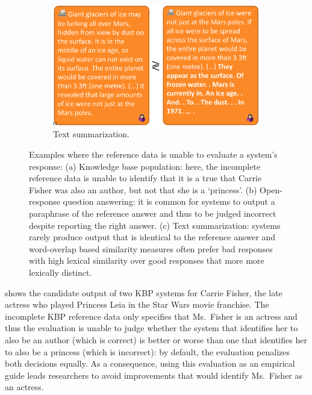 \begin{figure}
  \begin{subfigure}{0.65\textwidth}
    \includegraphics[width=\textwidth]{figures/example-summarization}
    \caption{\label{fig:intro:example-summarization} Text summarization. }
  \end{subfigure}
  \caption[Examples highlighting the limitations of incomplete evaluation sets]{\label{fig:intro:examples} Examples where the reference data is unable to evaluate a system's response:
  (a) Knowledge base population: here, the incomplete reference data is unable to identify that it is a true that Carrie Fisher was also an author, but not that she is a `princess'.
  (b) Open-response question answering: it is common for systems to output a paraphrase of the reference answer and thus to be judged incorrect despite reporting the right answer.
  (c) Text summarization: systems rarely produce output that is identical to the reference answer and word-overlap based similarity measures often prefer bad responses with high lexical similarity over good responses that more more lexically distinct.  
  }
\end{figure}

 shows the candidate output of two KBP systems for Carrie Fisher, the late actress who played Princess Leia in the Star Wars movie franchise.
The incomplete KBP reference data only specifies that Ms.\ Fisher is an actress and thus the evaluation is unable to judge whether the system that identifies her to also be an author (which is correct) is better or worse than one that identifies her to also be a princess (which is incorrect): by default, the evaluation penalizes both decisions equally.
As a consequence, using this evaluation as an empirical guide leads researchers to avoid improvements that would identify Ms.\ Fisher as an actress.

